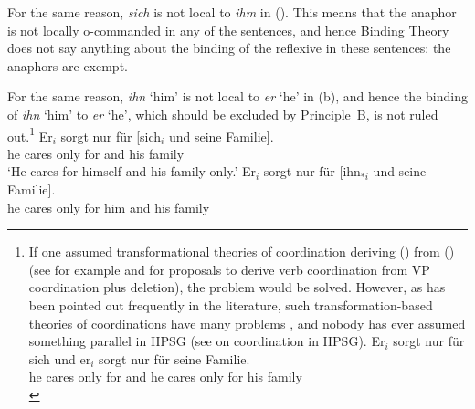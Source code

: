\documentclass[output=paper,biblatex,babelshorthands,newtxmath,draftmode,colorlinks,citecolor=brown]{langscibook}
\begin{document}
For the same reason, \emph{sich} is not local to \emph{ihm} in (). This means that the anaphor is not locally o-commanded in any
of the sentences, and hence Binding Theory does not say anything about the binding of the reflexive
in these sentences: the anaphors are exempt. 
%

For the same reason, \emph{ihn} `him' is not local to \emph{er} `he' in (b), and hence the
binding of \emph{ihn} `him' to \emph{er} `he', which should be excluded by Principle~B, is not ruled
out.\footnote{
If one assumed transformational theories of coordination deriving () from () (see for example
\citealp[]{WC80a-u} and \citealp[, 67]{Kayne94a-u} for proposals to derive verb
coordination from VP coordination plus deletion), the problem would be solved. However, as has been
pointed out frequently in the literature, such transformation-based theories of coordinations have
many problems \parencites[]{BV72}[--193]{Jackendoff77a}[]{Dowty79a}[--105]{denBesten83a}{Klein85}{Eisenberg94a}[]{Borsley2005a}, and nobody has ever assumed
something parallel in HPSG (see  on coordination in HPSG).
\ea
\gll Er$_{i}$ sorgt nur für sich     und er$_{i}$ sorgt nur für seine Familie.\\
     he      cares only for \self{} and he       cares only for his family\\
\z
}
\eal
\label{ex-sorgt-fuer-sich-und-seine-familie}
\ex
\gll Er$_{i}$ sorgt nur für [sich$_{i}$ und seine Familie].\\
     he      cares only for \spacebr{}\self{} and his family\\
\glt `He cares for himself and his family only.'
\ex 
\gll Er$_{i}$ sorgt nur für [ihn$_{*i}$ und seine Familie].\\
     he      cares only for \spacebr{}him and his family\\
\zl
\end{document}
